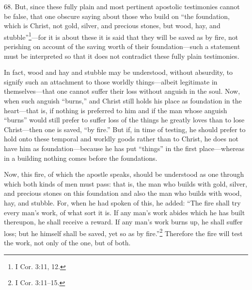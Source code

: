 68. But, since these fully plain and most pertinent apostolic testimonies cannot be false, that one obscure saying about those who build on ``the foundation, which is Christ, not gold, silver, and precious stones, but wood, hay, and stubble''\footnote{I Cor. 3:11, 12.}—for it is about these it is said that they will be saved as by fire, not perishing on account of the saving worth of their foundation—such a statement must be interpreted so that it does not contradict these fully plain testimonies.

In fact, wood and hay and stubble may be understood, without absurdity, to signify such an attachment to those worldly things—albeit legitimate in themselves—that one cannot suffer their loss without anguish in the soul. Now, when such anguish ``burns,'' and Christ still holds his place as foundation in the heart—that is, if nothing is preferred to him and if the man whose anguish ``burns'' would still prefer to suffer loss of the things he greatly loves than to lose Christ—then one is saved, ``by fire.'' But if, in time of testing, he should prefer to hold onto these temporal and worldly goods rather than to Christ, he does not have him as foundation—because he has put ``things'' in the first place—whereas in a building nothing comes before the foundations.

Now, this fire, of which the apostle speaks, should be understood as one through which both kinds of men must pass: that is, the man who builds with gold, silver, and precious stones on this foundation and also the man who builds with wood, hay, and stubble. For, when he had spoken of this, he added: ``The fire shall try every man's work, of what sort it is. If any man's work abides which he has built thereupon, he shall receive a reward. If any man's work burns up, he shall suffer loss; but he himself shall be saved, yet so as by fire.''\footnote{I Cor. 3:11–15.} Therefore the fire will test the work, not only of the one, but of both.

